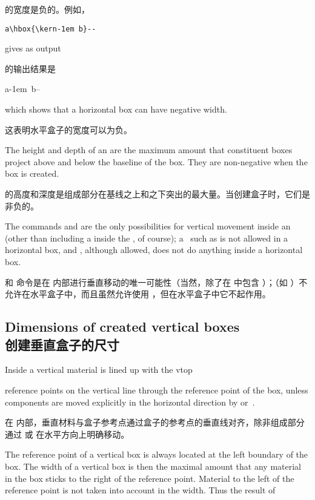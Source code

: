 \documentclass[twoside,letterpaper]{rapport3}
\begin{document}
的宽度是负的。例如，


\begin{disp}\verb>a\hbox{\kern-1em b}-->\end{disp}
gives as output

的输出结果是
\begin{disp}\leavevmode\hphantom{b}a\hbox{\kern-1em b}--\end{disp}
which shows that a horizontal box can have negative
width.

这表明水平盒子的宽度可以为负。

The height and depth of an  are the
maximum amount that constituent boxes project above and
below the baseline of the box. They are non-negative when the
box is created.

 的高度和深度是组成部分在基线之上和之下突出的最大量。当创建盒子时，它们是非负的。

The commands  and  are the only possibilities
for vertical movement inside an  (other than
including a  inside the , of course);
a~ \ldash such as  \rdash 
is not allowed in a horizontal box, and
, although allowed,
does not do anything inside a horizontal box.

 和  命令是在  内部进行垂直移动的唯一可能性（当然，除了在  中包含 ）；（如 ）不允许在水平盒子中，而且虽然允许使用 ，但在水平盒子中它不起作用。

\subsection{Dimensions of created vertical boxes\\创建垂直盒子的尺寸}

Inside a  vertical material is lined up with the
\cstoidx vtop\par
reference points on the vertical line through the reference
point of the box,
unless components are moved explicitly in the horizontal direction
by  or~.

在  内部，垂直材料与盒子参考点通过盒子的参考点的垂直线对齐，除非组成部分通过  或  在水平方向上明确移动。

The  reference point of a vertical box
is always located at the left boundary of the box.
The width of a vertical box
is then the maximal amount that any material in the
box sticks to the right of the reference point.
Material to the left of the reference point is
not taken into account in the width.
Thus the result of
\end{document}
